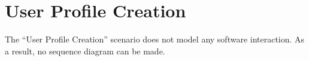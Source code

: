\section{User Profile Creation}
\label{scenario:user-profile-creation}

\npar The ``User Profile Creation'' scenario does not model any software
interaction. As a result, no sequence diagram can be made. 
